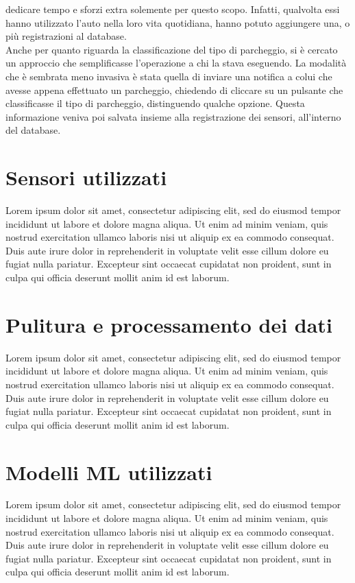 dedicare tempo e sforzi extra solemente per questo scopo. Infatti, qualvolta essi hanno
utilizzato l'auto nella loro vita quotidiana, hanno potuto aggiungere una, o più registrazioni
al database. \\
Anche per quanto riguarda la classificazione del tipo di parcheggio, si è cercato un approccio
che semplificasse l'operazione a chi la stava eseguendo. La modalità che è sembrata meno 
invasiva è stata quella di inviare una notifica a colui che avesse appena effettuato un
parcheggio, chiedendo di cliccare su un pulsante che classificasse il tipo di parcheggio, 
distinguendo qualche opzione. Questa informazione veniva poi salvata insieme alla registrazione
dei sensori, all'interno del database.\\



\section{Sensori utilizzati} Lorem ipsum dolor sit amet, consectetur adipiscing elit, sed do eiusmod tempor incididunt ut labore et dolore magna aliqua. Ut enim ad minim veniam, quis nostrud exercitation ullamco laboris nisi ut aliquip ex ea commodo consequat. Duis aute irure dolor in reprehenderit in voluptate velit esse cillum dolore eu fugiat nulla pariatur. Excepteur sint occaecat cupidatat non proident, sunt in culpa qui officia deserunt mollit anim id est laborum.
\section{Pulitura e processamento dei dati} Lorem ipsum dolor sit amet, consectetur adipiscing elit, sed do eiusmod tempor incididunt ut labore et dolore magna aliqua. Ut enim ad minim veniam, quis nostrud exercitation ullamco laboris nisi ut aliquip ex ea commodo consequat. Duis aute irure dolor in reprehenderit in voluptate velit esse cillum dolore eu fugiat nulla pariatur. Excepteur sint occaecat cupidatat non proident, sunt in culpa qui officia deserunt mollit anim id est laborum.
\section{Modelli ML utilizzati} Lorem ipsum dolor sit amet, consectetur adipiscing elit, sed do eiusmod tempor incididunt ut labore et dolore magna aliqua. Ut enim ad minim veniam, quis nostrud exercitation ullamco laboris nisi ut aliquip ex ea commodo consequat. Duis aute irure dolor in reprehenderit in voluptate velit esse cillum dolore eu fugiat nulla pariatur. Excepteur sint occaecat cupidatat non proident, sunt in culpa qui officia deserunt mollit anim id est laborum.


